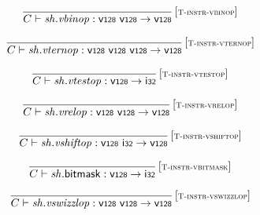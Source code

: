 $$
\begin{array}{@{}c@{}}\displaystyle
\frac{
}{
C \vdash {\mathit{sh}} {.} {\mathit{vbinop}} : \mathsf{v{\scriptstyle 128}}~\mathsf{v{\scriptstyle 128}} \rightarrow \mathsf{v{\scriptstyle 128}}
} \, {[\textsc{\scriptsize T{-}instr{-}vbinop}]}
\qquad
\end{array}
$$

$$
\begin{array}{@{}c@{}}\displaystyle
\frac{
}{
C \vdash {\mathit{sh}} {.} {\mathit{vternop}} : \mathsf{v{\scriptstyle 128}}~\mathsf{v{\scriptstyle 128}}~\mathsf{v{\scriptstyle 128}} \rightarrow \mathsf{v{\scriptstyle 128}}
} \, {[\textsc{\scriptsize T{-}instr{-}vternop}]}
\qquad
\end{array}
$$

$$
\begin{array}{@{}c@{}}\displaystyle
\frac{
}{
C \vdash {\mathit{sh}} {.} {\mathit{vtestop}} : \mathsf{v{\scriptstyle 128}} \rightarrow \mathsf{i{\scriptstyle 32}}
} \, {[\textsc{\scriptsize T{-}instr{-}vtestop}]}
\qquad
\end{array}
$$

$$
\begin{array}{@{}c@{}}\displaystyle
\frac{
}{
C \vdash {\mathit{sh}} {.} {\mathit{vrelop}} : \mathsf{v{\scriptstyle 128}}~\mathsf{v{\scriptstyle 128}} \rightarrow \mathsf{v{\scriptstyle 128}}
} \, {[\textsc{\scriptsize T{-}instr{-}vrelop}]}
\qquad
\end{array}
$$

$$
\begin{array}{@{}c@{}}\displaystyle
\frac{
}{
C \vdash {\mathit{sh}} {.} {\mathit{vshiftop}} : \mathsf{v{\scriptstyle 128}}~\mathsf{i{\scriptstyle 32}} \rightarrow \mathsf{v{\scriptstyle 128}}
} \, {[\textsc{\scriptsize T{-}instr{-}vshiftop}]}
\qquad
\end{array}
$$

$$
\begin{array}{@{}c@{}}\displaystyle
\frac{
}{
C \vdash {\mathit{sh}}{.}\mathsf{bitmask} : \mathsf{v{\scriptstyle 128}} \rightarrow \mathsf{i{\scriptstyle 32}}
} \, {[\textsc{\scriptsize T{-}instr{-}vbitmask}]}
\qquad
\end{array}
$$

$$
\begin{array}{@{}c@{}}\displaystyle
\frac{
}{
C \vdash {\mathit{sh}} {.} {\mathit{vswizzlop}} : \mathsf{v{\scriptstyle 128}}~\mathsf{v{\scriptstyle 128}} \rightarrow \mathsf{v{\scriptstyle 128}}
} \, {[\textsc{\scriptsize T{-}instr{-}vswizzlop}]}
\qquad
\end{array}
$$

